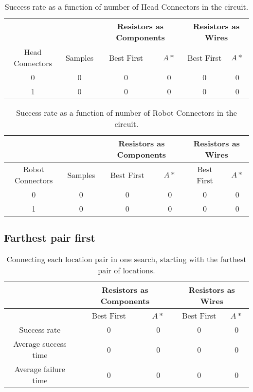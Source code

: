 \begin{table}[H]
\begin{center}
\begin{singlespace}
\begin{tabular}{| c | c || c | c | c | c |}
\hline
 & & \multicolumn{2}{|c|}{Resistors as Components} & \multicolumn{2}{|c|}{
 Resistors as Wires} \\
\hline
Head Connectors & Samples & Best First & $A*$ & Best First & $A*$ \\
\hline\hline
0 & 0 & 0 & 0 & 0 & 0 \\
1 & 0 & 0 & 0 & 0 & 0 \\
\hline
\end{tabular}
\end{singlespace}
\end{center}
\caption{Success rate as a function of number of Head Connectors in the circuit.}
\end{table}

\begin{table}[H]
\begin{center}
\begin{singlespace}
\begin{tabular}{| c | c || c | c | c | c |}
\hline
 & & \multicolumn{2}{|c|}{Resistors as Components} & \multicolumn{2}{|c|}{
 Resistors as Wires} \\
\hline
Robot Connectors & Samples & Best First & $A*$ & Best First & $A*$ \\
\hline\hline
0 & 0 & 0 & 0 & 0 & 0 \\
1 & 0 & 0 & 0 & 0 & 0 \\
\hline
\end{tabular}
\end{singlespace}
\end{center}
\caption{Success rate as a function of number of Robot Connectors in the circuit.}
\end{table}

\subsection{Farthest pair first}

\begin{table}[H]
\begin{center}
\begin{singlespace}
\begin{tabular}{| c || c | c | c | c |}
\hline
 & \multicolumn{2}{|c|}{Resistors as Components} & \multicolumn{2}{|c|}{
 Resistors as Wires} \\
\hline
 & Best First & $A*$ & Best First & $A*$ \\
\hline\hline
Success rate & 0 & 0 & 0 & 0 \\
Average success time & 0 & 0 & 0 & 0 \\
Average failure time & 0 & 0 & 0 & 0 \\
\hline
\end{tabular}
\end{singlespace}
\end{center}
\caption{Connecting each location pair in one search, starting with the farthest
pair of locations.}
\end{table}

